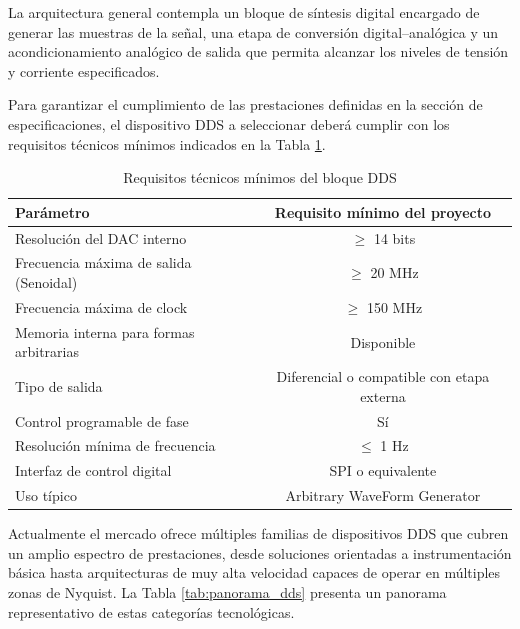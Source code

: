 La arquitectura general contempla un bloque de síntesis digital encargado de generar las muestras de la señal, una etapa de conversión digital–analógica y un acondicionamiento analógico de salida que permita alcanzar los niveles de tensión y corriente especificados.

Para garantizar el cumplimiento de las prestaciones definidas en la sección de especificaciones, el dispositivo DDS a seleccionar deberá cumplir con los requisitos técnicos mínimos indicados en la Tabla \ref{tab:requisitos_dds}.

\begin{table}[H]
	\centering
	\renewcommand{\arraystretch}{1.3}
	\begin{tabular}{|l|c|}
		\hline
		\textbf{Parámetro} & \textbf{Requisito mínimo del proyecto} \\ \hline
		
		Resolución del DAC interno & $\geq$ 14 bits \\ \hline
		
		Frecuencia máxima de salida (Senoidal) & $\geq$ 20 MHz \\ \hline
		
		Frecuencia máxima de clock & $\geq$ 150 MHz \\ \hline
		
		Memoria interna para formas arbitrarias & Disponible \\ \hline
		
		Tipo de salida & Diferencial o compatible con etapa externa \\ \hline
		
		Control programable de fase & Sí \\ \hline
		
		Resolución mínima de frecuencia & $\leq$ 1 Hz \\ \hline
		
		Interfaz de control digital & SPI o equivalente \\ \hline
		
		Uso típico & Arbitrary WaveForm Generator \\ \hline
		
	\end{tabular}
	\caption{Requisitos técnicos mínimos del bloque DDS}
	\label{tab:requisitos_dds}
\end{table}

Actualmente el mercado ofrece múltiples familias de dispositivos DDS que cubren un amplio espectro de prestaciones, desde soluciones orientadas a instrumentación básica hasta arquitecturas de muy alta velocidad capaces de operar en múltiples zonas de Nyquist. La Tabla \ref{tab:panorama_dds} presenta un panorama representativo de estas categorías tecnológicas.


